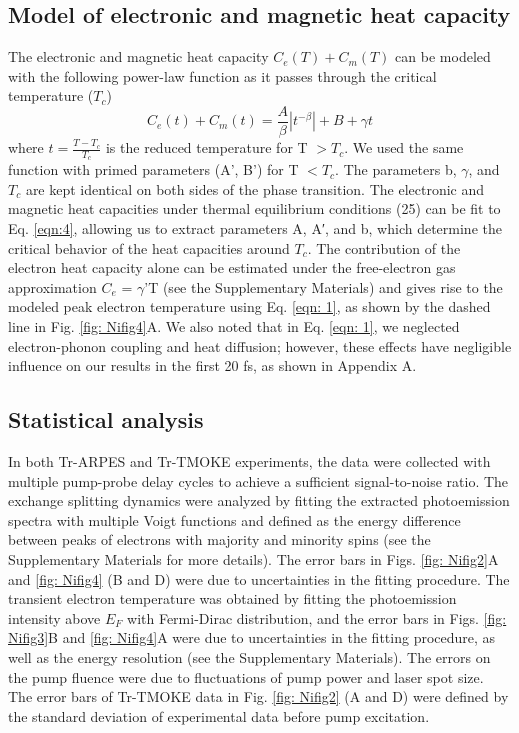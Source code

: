 \subsection{Model of electronic and magnetic heat capacity}
The electronic and magnetic heat capacity $C_e(T)+ C_m(T)$ can be modeled with the following power-law function as it passes through the critical temperature ($T_c$) \cite{Kornblit1975}
\begin{equation}
C_{e}(t)+C_m(t) = \frac{A}{\beta}|t^{-\beta}| + B + \gamma t
\label{eqn:4}
\end{equation}
where $t=\frac{T-T_{c}}{T_c}$ is the reduced temperature for T $> T_c$. We used the same function with primed parameters (A', B') for T $< T_c$. The parameters b, $\gamma$, and $T_c$ are kept identical on both sides of the phase transition. The electronic and magnetic heat capacities under thermal equilibrium conditions (25) can be fit to Eq. \ref{eqn:4}, allowing us to extract parameters A, A′, and b, which determine the critical behavior of the heat capacities around $T_c$. The contribution of the electron heat capacity alone can be estimated under the free-electron gas approximation $C_e$ = $\gamma$’T (see the Supplementary Materials) and gives rise to the modeled peak electron temperature using Eq. \ref{eqn: 1}, as shown by the dashed line in Fig. \ref{fig: Nifig4}A. We also noted that in Eq. \ref{eqn: 1}, we neglected electron-phonon coupling and heat diffusion; however, these effects have negligible influence on our results in the first 20 fs, as shown in Appendix A.

\subsection{Statistical analysis}
In both Tr-ARPES and Tr-TMOKE experiments, the data were collected with multiple pump-probe delay cycles to achieve a sufficient signal-to-noise ratio. The exchange splitting dynamics were analyzed by fitting the extracted photoemission spectra with multiple Voigt functions and defined as the energy difference between peaks of electrons with majority and minority spins (see the Supplementary Materials for more details). The error bars in Figs. \ref{fig: Nifig2}A and \ref{fig: Nifig4} (B and D) were due to uncertainties in the fitting procedure. The transient electron temperature was obtained by fitting the photoemission intensity above $E_{F}$ with Fermi-Dirac distribution, and the error bars in Figs. \ref{fig: Nifig3}B and \ref{fig: Nifig4}A were due to uncertainties in the fitting procedure, as well as the energy resolution (see the Supplementary Materials). The errors on the pump fluence were due to fluctuations of pump power and laser spot size. The error bars of Tr-TMOKE data in Fig. \ref{fig: Nifig2} (A and D) were defined by the standard deviation of experimental data before pump excitation.


